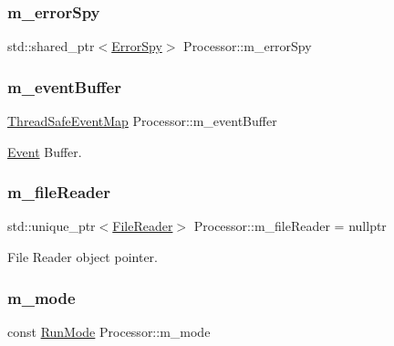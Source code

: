 \subsubsection{\texorpdfstring{m\+\_\+error\+Spy}{m\_errorSpy}}
{\footnotesize\ttfamily std\+::shared\+\_\+ptr$<$\hyperlink{class_error_spy}{Error\+Spy}$>$ Processor\+::m\+\_\+error\+Spy\hspace{0.3cm}{\ttfamily [private]}}

\mbox{\label{class_processor_a7cb15fbab19fceb6bc5a607629ff5040}} 
\subsubsection{\texorpdfstring{m\+\_\+event\+Buffer}{m\_eventBuffer}}
{\footnotesize\ttfamily \hyperlink{class_thread_safe_event_map}{Thread\+Safe\+Event\+Map} Processor\+::m\+\_\+event\+Buffer\hspace{0.3cm}{\ttfamily [private]}}



\hyperlink{class_event}{Event} Buffer. 

\mbox{\label{class_processor_aafe2ae55e609005c0e88226f1dd1dcb5}} 
\subsubsection{\texorpdfstring{m\+\_\+file\+Reader}{m\_fileReader}}
{\footnotesize\ttfamily std\+::unique\+\_\+ptr$<$\hyperlink{class_file_reader}{File\+Reader}$>$ Processor\+::m\+\_\+file\+Reader = nullptr\hspace{0.3cm}{\ttfamily [private]}}



File Reader object pointer. 

\mbox{\label{class_processor_ac22f412163181f546d847ce23d71978d}} 
\subsubsection{\texorpdfstring{m\+\_\+mode}{m\_mode}}
{\footnotesize\ttfamily const \hyperlink{_modes_enum_8hpp_a3dfe11cf1a3a8121f6cd7fec4bf5947e}{Run\+Mode} Processor\+::m\+\_\+mode\hspace{0.3cm}{\ttfamily [private]}}



